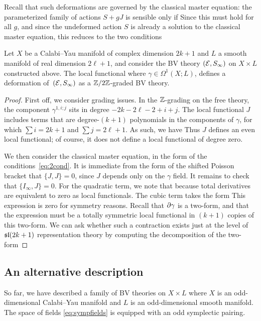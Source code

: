 \documentclass[11pt]{amsart}
\begin{document}
Recall that such deformations are governed by the classical master equation: the parameterized family of actions $S + g J$ is sensible only if 
Since this must hold for all $g$, and since the undeformed action $S$ is already a solution to the classical master equation, this reduces to the two conditions 
\begin{thm}
  Let $X$ be a Calabi--Yau manifold of complex dimension $2k+1$ and $L$ a smooth manifold of real dimension $2\ell + 1$, and consider the BV theory $(\mathcal E, S_\infty)$ on $X \times L$ constructed above. The local functional 
  where $\gamma \in \Omega^1(X;L)$, defines a deformation of~$(\mathcal E,S_\infty)$ as a $\mathbb{Z}/2\mathbb{Z}$-graded BV theory.
\end{thm}
\begin{proof}
  First off, we consider grading issues. In the $\mathbb{Z}$-grading on the free theory, the component $\gamma^{1,i;j}$ sits in degree $-2k-2\ell -2+i+j$. The local functional $J$ includes terms that are degree-$(k+1)$ polynomials in the components of $\gamma$, for which $\sum i = 2k+1$ and $\sum j = 2\ell + 1$. As such, we have
  Thus $J$ defines an even local functional; of course, it does not define a local functional of degree zero.

  We then consider the classical master equation, in the form of the conditions~\eqref{eq:2cond}. It is immediate from the form of the shifted Poisson bracket that $\{J,J\} = 0$, since $J$ depends only on the $\gamma$ field. It remains to check that $\{I_\infty,J\} = 0$. For the quadratic term, we note that 
  because total derivatives are equivalent to zero as local functionals. The cubic term takes the form
This expression is zero for symmetry reasons. Recall that $\partial\gamma$ is a two-form, and that the expression must be a totally symmetric local functional in $(k+1)$ copies of this two-form. We can ask whether such a  contraction exists just at the level of $\mathfrak{sl}(2k+1)$ representation theory by computing the decomposition of the two-form  
\end{proof}

\subsection{An alternative description} 
So far, we have described a family of BV theories on $X \times L$ where $X$ is an odd-dimensional Calabi--Yau manifold and $L$ is an odd-dimensional smooth manifold. 
The space of fields \eqref{eq:sympfields} is equipped with an odd symplectic pairing. 
\end{document}
